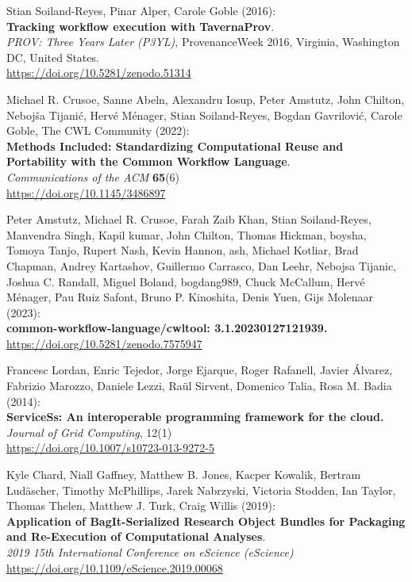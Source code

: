 \documentclass[10pt,letterpaper]{article}
\begin{document}
\begin{thebibliography}{10}
\begin{small}
Stian Soiland-Reyes, Pinar Alper, Carole Goble (2016):\\
\textbf{Tracking workflow execution with TavernaProv}.\\
\emph{PROV: Three Years Later (P3YL)}, ProvenanceWeek 2016, Virginia, Washington DC, United States. \\
\url{https://doi.org/10.5281/zenodo.51314}

Michael R. Crusoe, Sanne Abeln, Alexandru Iosup, Peter Amstutz, John Chilton, Nebojša Tijanić, Hervé Ménager, Stian Soiland-Reyes, Bogdan Gavrilović, Carole Goble, The CWL Community
(2022):\\
\textbf{Methods Included: Standardizing Computational Reuse and
Portability with the Common Workflow Language}.\\
\emph{Communications of the ACM} \textbf{65}(6)\\
\url{https://doi.org/10.1145/3486897}

Peter Amstutz, Michael R. Crusoe, Farah Zaib Khan, Stian Soiland-Reyes, Manvendra Singh, Kapil kumar, John Chilton, Thomas Hickman, boysha, Tomoya Tanjo, Rupert Nash, Kevin Hannon, ash, Michael Kotliar, Brad Chapman, Andrey Kartashov, Guillermo Carrasco, Dan Leehr, Nebojsa Tijanic, Joshua C. Randall, Miguel Boland, bogdang989, Chuck McCallum, Hervé Ménager, Pau Ruiz Safont, Bruno P. Kinoshita, Denis Yuen, Gijs Molenaar (2023):\\
\textbf{common-workflow-language/cwltool: 3.1.20230127121939.}\\
\url{https://doi.org/10.5281/zenodo.7575947}

 Francesc Lordan, Enric Tejedor, Jorge Ejarque, Roger
Rafanell, Javier Álvarez, Fabrizio Marozzo, Daniele Lezzi, Raül Sirvent,
Domenico Talia, Rosa M. Badia (2014):\\
\textbf{ServiceSs: An interoperable programming framework for the
cloud.}\\
\emph{Journal of Grid Computing}, 12(1)\\
\url{https://doi.org/10.1007/s10723-013-9272-5}

Kyle Chard, Niall Gaffney, Matthew B. Jones, Kacper
Kowalik, Bertram Ludäscher, Timothy McPhillips, Jarek Nabrzyski,
Victoria Stodden, Ian Taylor, Thomas Thelen, Matthew J. Turk, Craig
Willis (2019):\\
\textbf{Application of BagIt-Serialized Research Object Bundles for Packaging and Re-Execution of Computational Analyses}.\\
\emph{2019 15th International Conference on eScience (eScience)}\\
\url{https://doi.org/10.1109/eScience.2019.00068}


\end{small}
\end{thebibliography}
\end{document}
